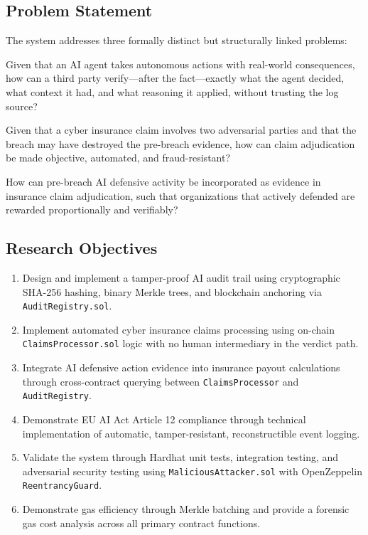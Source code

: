 \documentclass[12pt,a4paper]{article}
\begin{document}
\subsection{Problem Statement}
\label{sec:problem}

The system addresses three formally distinct but structurally linked
problems:

\begin{description}[leftmargin=2em]
  \item[\textbf{P1 (AI Accountability):}] Given that an AI agent takes
  autonomous actions with real-world consequences, how can a third party
  verify---after the fact---exactly what the agent decided, what context
  it had, and what reasoning it applied, without trusting the log source?

  \item[\textbf{P2 (Insurance Adjudication):}] Given that a cyber
  insurance claim involves two adversarial parties and that the breach
  may have destroyed the pre-breach evidence, how can claim adjudication
  be made objective, automated, and fraud-resistant?

  \item[\textbf{P3 (Integration):}] How can pre-breach AI defensive
  activity be incorporated as evidence in insurance claim adjudication,
  such that organizations that actively defended are rewarded
  proportionally and verifiably?
\end{description}

\subsection{Research Objectives}
\label{sec:objectives}

\begin{enumerate}[label=\textbf{O\arabic*.}]
  \item Design and implement a tamper-proof AI audit trail using
        cryptographic SHA-256 hashing, binary Merkle trees, and
        blockchain anchoring via \texttt{AuditRegistry.sol}.
  \item Implement automated cyber insurance claims processing using
        on-chain \texttt{ClaimsProcessor.sol} logic with no human
        intermediary in the verdict path.
  \item Integrate AI defensive action evidence into insurance payout
        calculations through cross-contract querying between
        \texttt{ClaimsProcessor} and \texttt{AuditRegistry}.
  \item Demonstrate EU AI Act Article 12 compliance through technical
        implementation of automatic, tamper-resistant, reconstructible
        event logging.
  \item Validate the system through Hardhat unit tests, integration
        testing, and adversarial security testing using
        \texttt{MaliciousAttacker.sol} with OpenZeppelin
        \texttt{ReentrancyGuard}.
  \item Demonstrate gas efficiency through Merkle batching and provide
        a forensic gas cost analysis across all primary contract functions.
\end{enumerate}
\end{document}
